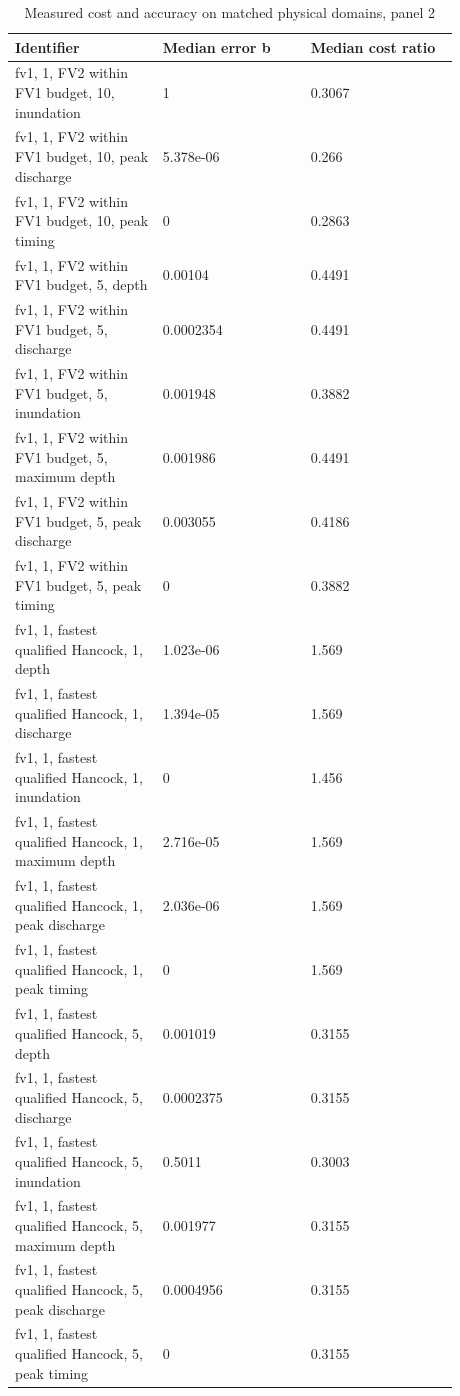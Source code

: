\begin{longtable}{p{0.2933\linewidth}p{0.2933\linewidth}p{0.2933\linewidth}}
\caption{Measured cost and accuracy on matched physical domains, panel 2}\\
\hline
Identifier & Median error b & Median cost ratio \\
\hline\endhead
fv1, 1, FV2 within FV1 budget, 10, inundation & 1 & 0.3067 \\
fv1, 1, FV2 within FV1 budget, 10, peak discharge & 5.378e-06 & 0.266 \\
fv1, 1, FV2 within FV1 budget, 10, peak timing & 0 & 0.2863 \\
fv1, 1, FV2 within FV1 budget, 5, depth & 0.00104 & 0.4491 \\
fv1, 1, FV2 within FV1 budget, 5, discharge & 0.0002354 & 0.4491 \\
fv1, 1, FV2 within FV1 budget, 5, inundation & 0.001948 & 0.3882 \\
fv1, 1, FV2 within FV1 budget, 5, maximum depth & 0.001986 & 0.4491 \\
fv1, 1, FV2 within FV1 budget, 5, peak discharge & 0.003055 & 0.4186 \\
fv1, 1, FV2 within FV1 budget, 5, peak timing & 0 & 0.3882 \\
fv1, 1, fastest qualified Hancock, 1, depth & 1.023e-06 & 1.569 \\
fv1, 1, fastest qualified Hancock, 1, discharge & 1.394e-05 & 1.569 \\
fv1, 1, fastest qualified Hancock, 1, inundation & 0 & 1.456 \\
fv1, 1, fastest qualified Hancock, 1, maximum depth & 2.716e-05 & 1.569 \\
fv1, 1, fastest qualified Hancock, 1, peak discharge & 2.036e-06 & 1.569 \\
fv1, 1, fastest qualified Hancock, 1, peak timing & 0 & 1.569 \\
fv1, 1, fastest qualified Hancock, 5, depth & 0.001019 & 0.3155 \\
fv1, 1, fastest qualified Hancock, 5, discharge & 0.0002375 & 0.3155 \\
fv1, 1, fastest qualified Hancock, 5, inundation & 0.5011 & 0.3003 \\
fv1, 1, fastest qualified Hancock, 5, maximum depth & 0.001977 & 0.3155 \\
fv1, 1, fastest qualified Hancock, 5, peak discharge & 0.0004956 & 0.3155 \\
fv1, 1, fastest qualified Hancock, 5, peak timing & 0 & 0.3155 \\

\end{longtable}

